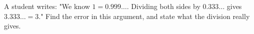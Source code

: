 A student writes: "We know $1=0.999\ldots$. Dividing both sides by $0.333\ldots$ gives $3.333\ldots=3$." Find the error in this argument, and state what the division really gives.
